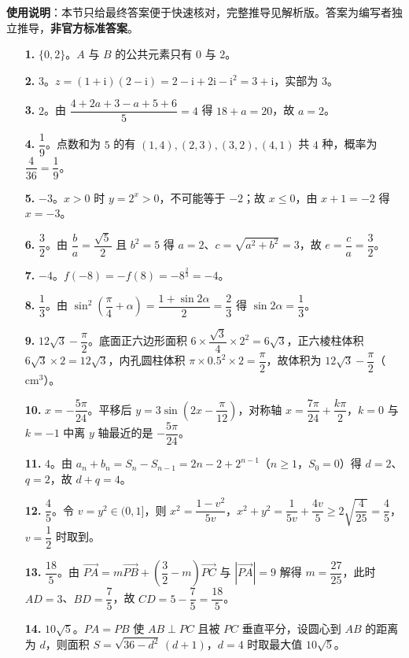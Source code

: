 
\begin{gknotice}
\textbf{使用说明}：本节只给最终答案便于快速核对，完整推导见解析版。答案为编写者独立推导，\textbf{非官方标准答案}。
\end{gknotice}

\begin{itemize}[leftmargin=2.6em]
  \item[\textbf{1.}] $\{0,2\}$。$A$ 与 $B$ 的公共元素只有 $0$ 与 $2$。
  \item[\textbf{2.}] $3$。$z=(1+\mathrm i)(2-\mathrm i)=2-\mathrm i+2\mathrm i-\mathrm i^2=3+\mathrm i$，实部为 $3$。
  \item[\textbf{3.}] $2$。由 $\dfrac{4+2a+3-a+5+6}5=4$ 得 $18+a=20$，故 $a=2$。
  \item[\textbf{4.}] $\dfrac19$。点数和为 $5$ 的有 $(1,4),(2,3),(3,2),(4,1)$ 共 $4$ 种，概率为 $\dfrac4{36}=\dfrac19$。
  \item[\textbf{5.}] $-3$。$x>0$ 时 $y=2^x>0$，不可能等于 $-2$；故 $x\leqslant0$，由 $x+1=-2$ 得 $x=-3$。
  \item[\textbf{6.}] $\dfrac32$。由 $\dfrac{b}{a}=\dfrac{\sqrt5}{2}$ 且 $b^2=5$ 得 $a=2$、$c=\sqrt{a^2+b^2}=3$，故 $e=\dfrac ca=\dfrac32$。
  \item[\textbf{7.}] $-4$。$f(-8)=-f(8)=-8^{\frac23}=-4$。
  \item[\textbf{8.}] $\dfrac13$。由 $\sin^2\left(\dfrac\pi4+\alpha\right)=\dfrac{1+\sin2\alpha}2=\dfrac23$ 得 $\sin2\alpha=\dfrac13$。
  \item[\textbf{9.}] $12\sqrt3-\dfrac\pi2$。底面正六边形面积 $6\times\dfrac{\sqrt3}4\times2^2=6\sqrt3$，正六棱柱体积 $6\sqrt3\times2=12\sqrt3$，内孔圆柱体积 $\pi\times0.5^2\times2=\dfrac\pi2$，故体积为 $12\sqrt3-\dfrac\pi2$（$\mathrm{cm}^3$）。
  \item[\textbf{10.}] $x=-\dfrac{5\pi}{24}$。平移后 $y=3\sin\left(2x-\dfrac\pi{12}\right)$，对称轴 $x=\dfrac{7\pi}{24}+\dfrac{k\pi}2$，$k=0$ 与 $k=-1$ 中离 $y$ 轴最近的是 $-\dfrac{5\pi}{24}$。
  \item[\textbf{11.}] $4$。由 $a_n+b_n=S_n-S_{n-1}=2n-2+2^{n-1}$（$n\geqslant1$，$S_0=0$）得 $d=2$、$q=2$，故 $d+q=4$。
  \item[\textbf{12.}] $\dfrac45$。令 $v=y^2\in(0,1]$，则 $x^2=\dfrac{1-v^2}{5v}$，$x^2+y^2=\dfrac1{5v}+\dfrac{4v}5\geqslant2\sqrt{\dfrac4{25}}=\dfrac45$，$v=\dfrac12$ 时取到。
  \item[\textbf{13.}] $\dfrac{18}5$。由 $\overrightarrow{PA}=m\overrightarrow{PB}+\left(\dfrac32-m\right)\overrightarrow{PC}$ 与 $|\overrightarrow{PA}|=9$ 解得 $m=\dfrac{27}{25}$，此时 $AD=3$、$BD=\dfrac75$，故 $CD=5-\dfrac75=\dfrac{18}5$。
  \item[\textbf{14.}] $10\sqrt5$。$PA=PB$ 使 $AB\perp PC$ 且被 $PC$ 垂直平分，设圆心到 $AB$ 的距离为 $d$，则面积 $S=\sqrt{36-d^2}\,(d+1)$，$d=4$ 时取最大值 $10\sqrt5$。
\end{itemize}

